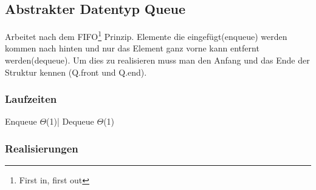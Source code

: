 \documentclass[jou,apacite]{apa6}
\begin{document}
\subsection{Abstrakter Datentyp Queue}
Arbeitet nach dem FIFO\footnote{First in, first out} Prinzip. Elemente die eingefügt(enqueue) werden kommen nach hinten und nur das Element ganz vorne kann entfernt werden(dequeue). Um dies zu realisieren muss man den Anfang und das Ende der Struktur kennen (Q.front und Q.end). \\
\subsubsection{Laufzeiten}
Enqueue    $\Theta$(1)| Dequeue $\Theta$(1) \\
\subsubsection{Realisierungen}
\end{document}
